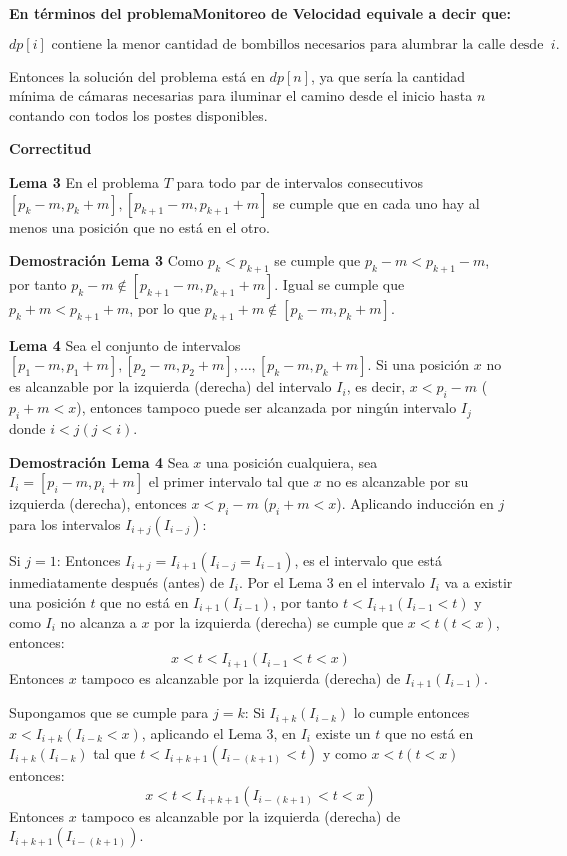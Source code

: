 \documentclass{article}
\begin{document}
\textbf{En términos del problemaMonitoreo de Velocidad equivale a decir que:}

\[
dp[i] \text{ contiene la menor cantidad de bombillos necesarios para alumbrar la calle desde la posición 1 hasta la } i.
\]

Entonces la solución del problema está en \( dp[n] \), ya que sería la cantidad mínima de cámaras necesarias para iluminar el camino desde el inicio hasta \( n \) contando con todos los postes disponibles.


\textbf{Correctitud}

\textbf{Lema 3}
En el problema \( T \) para todo par de intervalos consecutivos \([p_k - m, p_k + m],[p_{k+1} - m, p_{k+1} + m]\) se cumple que en cada uno hay al menos una posición que no está en el otro.

\textbf{Demostración Lema 3}
Como \( p_k < p_{k+1} \) se cumple que \( p_k - m < p_{k+1} - m \), por tanto \( p_k - m \notin [p_{k+1} - m, p_{k+1} + m] \).
Igual se cumple que \( p_k + m < p_{k+1} + m \), por lo que \( p_{k+1} + m \notin [p_k - m, p_k + m] \).

\textbf{Lema 4}
Sea el conjunto de intervalos \([p_1 - m, p_1 + m], [p_2 - m, p_2 + m], \ldots, [p_k - m, p_k + m]\). Si una posición \( x \) no es alcanzable por la izquierda (derecha) del intervalo \( I_i \), es decir, \( x < p_i - m \) (\( p_i + m < x \)), entonces tampoco puede ser alcanzada por ningún intervalo \( I_j \) donde \( i < j (j < i) \).

\textbf{Demostración Lema 4}
Sea \( x \) una posición cualquiera, sea \( I_i = [p_i - m, p_i + m] \) el primer intervalo tal que \( x \) no es alcanzable por su izquierda (derecha), entonces \( x < p_i - m \) (\( p_i + m < x \)). Aplicando inducción en \( j \) para los intervalos \( I_{i+j} (I_{i-j}) \):

Si \( j = 1 \):
Entonces \( I_{i+j} = I_{i+1} (I_{i-j} = I_{i-1}) \), es el intervalo que está inmediatamente después (antes) de \( I_i \). Por el Lema 3 en el intervalo \( I_i \) va a existir una posición \( t \) que no está en \( I_{i+1} (I_{i-1}) \), por tanto \( t < I_{i+1} (I_{i-1} < t) \) y como \( I_i \) no alcanza a \( x \) por la izquierda (derecha) se cumple que \( x < t (t < x) \), entonces:
\[
x < t < I_{i+1} (I_{i-1} < t < x)
\]
Entonces \( x \) tampoco es alcanzable por la izquierda (derecha) de \( I_{i+1} (I_{i-1}) \).

Supongamos que se cumple para \( j = k \):
Si \( I_{i+k} (I_{i-k}) \) lo cumple entonces \( x < I_{i+k} (I_{i-k} < x) \), aplicando el Lema 3, en \( I_i \) existe un \( t \) que no está en \( I_{i+k} (I_{i-k}) \) tal que \( t < I_{i+k+1} (I_{i-(k+1)} < t) \) y como \( x < t (t < x) \) entonces:
\[
x < t < I_{i+k+1} (I_{i-(k+1)} < t < x)
\]
Entonces \( x \) tampoco es alcanzable por la izquierda (derecha) de \( I_{i+k+1} (I_{i-(k+1)}) \).
\end{document}
